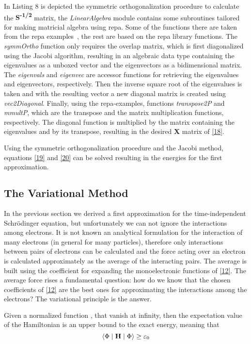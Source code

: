 \documentclass{tmr}
\begin{document}
In Listing 8 is depicted the symmetric orthogonalization procedure to calculate
the \textbf{S\textsuperscript{-1/2}} matrix, the \textit{LinearAlgebra} module 
contains some subroutines tailored for making matricial algebra using repa.
 Some of the functions there are taken from the repa examples~\cite{repaExam},
the rest are based on the repa library functions. The \textit{symmOrtho} 
function only requires the overlap matrix, which is first diagonalized using 
the Jacobi algorithm, resulting in an algebraic data type containing the eigenvalues
 as a unboxed vector and the eigenvectors  as a bidimensional matrix. The \textit{eigenvals} 
and \textit{eigenvec} are accessor functions
for retrieving the eigenvalues and eigenvectors, respectively.
Then the inverse square root of the eigenvalues is taken and with the resulting vector
a new diagonal matrix is created using \textit{vec2Diagonal}. Finally, using
the repa-examples, functions \textit{transpose2P} and \textit{mmultP}, which are 
the transpose and the matrix multiplication functions, respectively. The diagonal
function is multiplied by the matrix containing the eigenvalues and by its transpose,
resulting in the desired \textbf{X} matrix of \eqref{18}.

Using the symmetric orthogonalization procedure and the Jacobi method, equations \eqref{19}
and \eqref{20} can be solved resulting in the energies for the first approximation.


\subsection{The Variational Method}

In the previous section we derived a first approximation for the time-independent 
Schr\"odinger equation, but unfortunately we can not ignore the interactions 
among electrons. It is not known an analytical formulation for the interaction
of many electrons (in general for many particles), therefore only 
interactions between pairs of electrons can be calculated and the
force acting over an electron is calculated approximately as
the average of the interacting pairs. The average is built using the coefficient
for expanding the monoelectronic functions of \eqref{12}. The average force
rises a fundamental question: how do we know that the chosen coefficients of \eqref{12}
are the best ones for approximating the interactions among the electrons? The variational
principle is the answer.

\begin{theorem}
Given a normalized function \textPhi, that vanish at infinity, then the expectation value 
of the Hamiltonian is an upper bound to the exact energy, meaning that
\[ \braket{\Phi \mid \mathbf{H} \mid \Phi} \geq \varepsilon_{0} \] 
\end{theorem}
\end{document}
